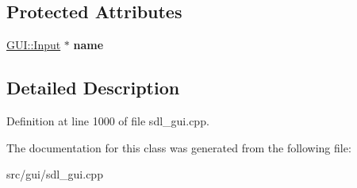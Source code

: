 \subsection*{Protected Attributes}
\begin{DoxyCompactItemize}
\item 
\hypertarget{classSaveLangDialog_aac396e13fdd8c3784b2c85e1d23adcd3}{\hyperlink{classGUI_1_1Input}{G\-U\-I\-::\-Input} $\ast$ {\bfseries name}}\label{classSaveLangDialog_aac396e13fdd8c3784b2c85e1d23adcd3}

\end{DoxyCompactItemize}


\subsection{Detailed Description}


Definition at line 1000 of file sdl\-\_\-gui.\-cpp.



The documentation for this class was generated from the following file\-:\begin{DoxyCompactItemize}
\item 
src/gui/sdl\-\_\-gui.\-cpp\end{DoxyCompactItemize}
